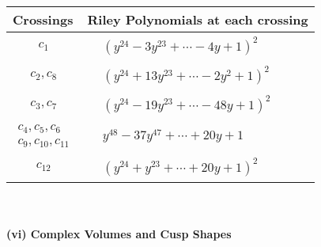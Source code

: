 \documentclass[1p]{elsarticle_modified}
\theoremstyle{definition}
\begin{document}
\begin{tabular}{m{50pt}|m{274pt}}
Crossings & \hspace{64pt}Riley Polynomials at each crossing \\
\hline $$\begin{aligned}c_{1}\end{aligned}$$&$\begin{aligned}
&(y^{24}-3 y^{23}+\cdots-4 y+1)^{2}
\end{aligned}$\\
\hline $$\begin{aligned}c_{2},c_{8}\end{aligned}$$&$\begin{aligned}
&(y^{24}+13 y^{23}+\cdots-2 y^2+1)^{2}
\end{aligned}$\\
\hline $$\begin{aligned}c_{3},c_{7}\end{aligned}$$&$\begin{aligned}
&(y^{24}-19 y^{23}+\cdots-48 y+1)^{2}
\end{aligned}$\\
\hline $$\begin{aligned}c_{4},c_{5},c_{6}\\c_{9},c_{10},c_{11}\end{aligned}$$&$\begin{aligned}
&y^{48}-37 y^{47}+\cdots+20 y+1
\end{aligned}$\\
\hline $$\begin{aligned}c_{12}\end{aligned}$$&$\begin{aligned}
&(y^{24}+y^{23}+\cdots+20 y+1)^{2}
\end{aligned}$\\
\hline
\end{tabular}\\~\\
\newpage\flushleft \textbf{(vi) Complex Volumes and Cusp Shapes}
\end{document}
